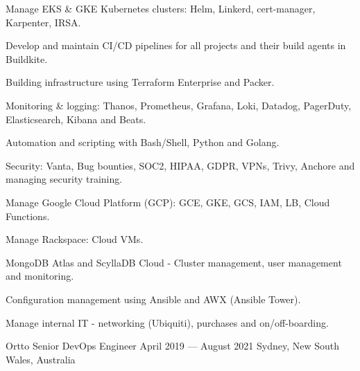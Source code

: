 \begin{experiences}
{\begin{cvitems}
      \item {Manage EKS \& GKE Kubernetes clusters: Helm, Linkerd, cert-manager, Karpenter, IRSA.}
      \item {Develop and maintain CI/CD pipelines for all projects and their build agents in Buildkite.}
      \item {Building infrastructure using Terraform Enterprise and Packer.}
      \item {Monitoring \& logging: Thanos, Prometheus, Grafana, Loki, Datadog, PagerDuty, Elasticsearch, Kibana and Beats.}
      \item {Automation and scripting with Bash/Shell, Python and Golang.}
      \item {Security: Vanta, Bug bounties, SOC2, HIPAA, GDPR, VPNs, Trivy, Anchore and managing security training.}
      \item {Manage Google Cloud Platform (GCP): GCE, GKE, GCS, IAM, LB, Cloud Functions.}
      \item {Manage Rackspace: Cloud VMs.}
      \item {MongoDB Atlas and ScyllaDB Cloud - Cluster management, user management and monitoring.}
      \item {Configuration management using Ansible and AWX (Ansible Tower).}
      \item {Manage internal IT - networking (Ubiquiti), purchases and on/off-boarding.}
    \end{cvitems}
  }

  \expitem
  {Ortto} %
  {Senior DevOps Engineer} %
  {April 2019 --- August 2021} %
  {Sydney, New South Wales, Australia} %
  {} %
  {} %
  {} %


\end{experiences}
